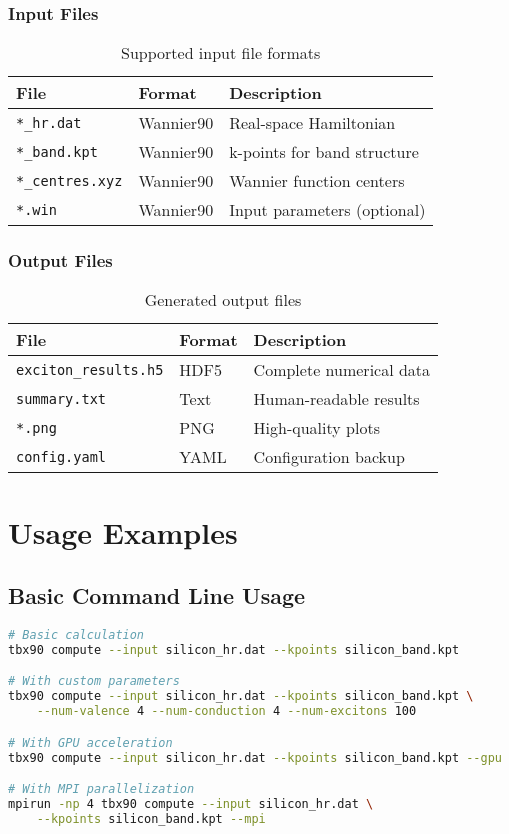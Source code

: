 \documentclass[11pt,a4paper]{article}
\newcommand{\code}[1]{\texttt{#1}}
\begin{document}
\subsubsection{Input Files}

\begin{table}[H]
\centering
\begin{tabular}{lll}
\toprule
File & Format & Description \\
\midrule
\code{*\_hr.dat} & Wannier90 & Real-space Hamiltonian \\
\code{*\_band.kpt} & Wannier90 & k-points for band structure \\
\code{*\_centres.xyz} & Wannier90 & Wannier function centers \\
\code{*.win} & Wannier90 & Input parameters (optional) \\
\bottomrule
\end{tabular}
\caption{Supported input file formats}
\end{table}

\subsubsection{Output Files}

\begin{table}[H]
\centering
\begin{tabular}{lll}
\toprule
File & Format & Description \\
\midrule
\code{exciton\_results.h5} & HDF5 & Complete numerical data \\
\code{summary.txt} & Text & Human-readable results \\
\code{*.png} & PNG & High-quality plots \\
\code{config.yaml} & YAML & Configuration backup \\
\bottomrule
\end{tabular}
\caption{Generated output files}
\end{table}

\section{Usage Examples}

\subsection{Basic Command Line Usage}

\begin{lstlisting}[language=bash]
# Basic calculation
tbx90 compute --input silicon_hr.dat --kpoints silicon_band.kpt

# With custom parameters
tbx90 compute --input silicon_hr.dat --kpoints silicon_band.kpt \
    --num-valence 4 --num-conduction 4 --num-excitons 100

# With GPU acceleration
tbx90 compute --input silicon_hr.dat --kpoints silicon_band.kpt --gpu

# With MPI parallelization
mpirun -np 4 tbx90 compute --input silicon_hr.dat \
    --kpoints silicon_band.kpt --mpi
\end{lstlisting}
\end{document}
